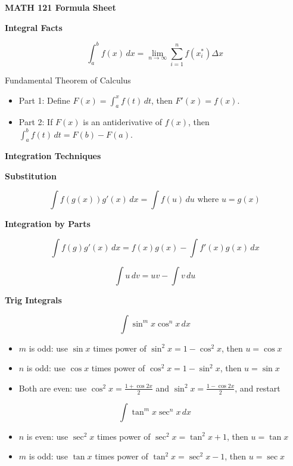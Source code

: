 \documentclass[10pt]{article}
\newcommand\sectionheading[1]{\begin{center}\large{\textbf{#1}}\end{center}\normalsize}
\newcommand\heading[1]{\smallskip\textbf{#1}\smallskip}
\begin{document}
\begin{center}
    \huge{\textbf{MATH 121 Formula Sheet}}
\end{center}

\begin{multicols*}{3}

\sectionheading{Integral Facts}
\[\int_{a}^{b}f(x)\,dx=\lim_{n\to\infty}\sum_{i=1}^{n}f(x_i^*)\Delta x\]

Fundamental Theorem of Calculus
\begin{itemize}[noitemsep,topsep=0pt]
    \item Part 1: Define $F(x)=\int_a^x f(t)\,dt$, then $F'(x)=f(x)$.
    \item Part 2: If $F(x)$ is an antiderivative of $f(x)$, then $\int_a^b f(t)\,dt = F(b)-F(a)$.
\end{itemize}

\sectionheading{Integration Techniques}

\heading{Substitution}

\[\int f(g(x))g'(x)\,dx = \int f(u)\,du \text{ where } u=g(x)\]


\heading{Integration by Parts}

\[\int f(g)g'(x)\,dx=f(x)g(x)-\int f'(x)g(x)\,dx\]

\[\int u\,dv = uv - \int v\,du\]

\heading{Trig Integrals}

\[\int \sin^m x \cos^n x\,dx\]

\begin{itemize}[noitemsep,topsep=0pt]
    \item $m$ is odd: use $\sin x$ times power of $\sin^2 x=1-\cos^2 x$, then $u=\cos x$
    \item $n$ is odd: use $\cos x$ times power of $\cos^2 x=1-\sin^2 x$, then $u=\sin x$
    \item Both are even: use $\cos^2 x=\frac{1+\cos2x}{2}$ and $\sin^2 x=\frac{1-\cos2x}{2}$, and restart
\end{itemize}

\[\int \tan^m x \sec^n x\,dx\]

\begin{itemize}[noitemsep,topsep=0pt]
    \item $n$ is even: use $\sec^2 x$ times power of $\sec^2 x=\tan^2 x+1$, then $u=\tan x$
    \item $m$ is odd: use $\tan x$ times power of $\tan^2 x=\sec^2 x-1$, then $u=\sec x$
\end{itemize}


\end{multicols*}
\end{document}

